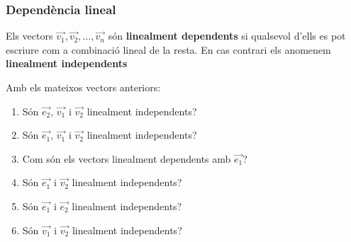 \documentclass{beamer}
\begin{document}
\begin{frame}
  \frametitle{Dependència lineal}

    Els vectors $\overrightarrow{v_1},\overrightarrow{v_2}, \ldots, \overrightarrow{v_n}$ són {\bf linealment dependents} si qualsevol d'ells es pot escriure com a combinació lineal de la resta. En cas contrari els anomenem {\bf linealment independents}

  \begin{exercise}{}
    Amb els mateixos vectors anteriors:
    \begin{enumerate}
      \item Són $\overrightarrow{e_2}$, $\overrightarrow{v_1}$ i $\overrightarrow{v_2}$ linealment independents?
      \item Són $\overrightarrow{e_1}$, $\overrightarrow{v_1}$ i $\overrightarrow{v_2}$ linealment independents?
      \item Com són els vectors linealment dependents amb $\overrightarrow{e_1}$?
      \item Són $\overrightarrow{e_1}$ i $\overrightarrow{v_2}$ linealment independents?
      \item Són $\overrightarrow{e_1}$ i $\overrightarrow{e_2}$ linealment independents?
      \item Són $\overrightarrow{v_1}$ i $\overrightarrow{v_2}$ linealment independents?
    \end{enumerate}
  \end{exercise}
\end{frame}
\end{document}
